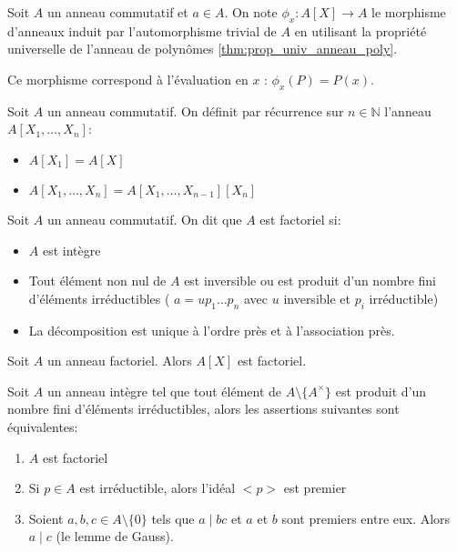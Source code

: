 \begin{definition}[Evaluation]
	Soit $A$ un anneau commutatif et $a \in A$. On note $\phi_x: A[X] \to A$ le morphisme d'anneaux
	induit par l'automorphisme trivial de $A$ en utilisant la propriété universelle de l'anneau de polynômes \ref{thm:prop_univ_anneau_poly}.

	Ce morphisme correspond à l'évaluation en $x$ : $\phi_x(P) = P(x)$.

\end{definition}

\begin{definition}
	Soit $A$ un anneau commutatif. On définit par récurrence sur $n \in \mathbb{N}$ l'anneau $A[X_1, \dots, X_n]$:
	\begin{itemize}
		\item $A[X_1] = A[X]$
		\item $A[X_1, \dots, X_n] = A[X_1, \dots, X_{n-1}][X_n]$
	\end{itemize}
\end{definition}


\begin{definition}
	Soit $A$ un anneau commutatif. On dit que $A$ est factoriel si:
	\begin{itemize}
		\item $A$ est intègre
		\item Tout élément non nul de $A$ est inversible ou est produit d'un nombre fini
		      d'éléments irréductibles ( $a = u p_1 \dots p_n$ avec $u$ inversible et $p_i$ irréductible)
		\item La décomposition est unique à l'ordre près et à l'association près.
	\end{itemize}
\end{definition}

\begin{prop}
	Soit $A$ un anneau factoriel. Alors $A[X]$ est factoriel.
\end{prop}


\begin{prop}
	Soit $A$ un anneau intègre tel que tout élément de $A\setminus\{A^{\times}\}$ est produit d'un nombre fini d'éléments irréductibles, alors les assertions suivantes sont équivalentes:
	\begin{enumerate}
		\item $A$ est factoriel
		\item Si $p \in A$ est irréductible, alors l'idéal $<p>$ est premier
		\item Soient $a,b,c \in A\setminus\{0\}$ tels que $a \mid bc$ et $a$ et $b$ sont premiers entre eux. Alors $a \mid c$ (le lemme de Gauss).
	\end{enumerate}
\end{prop}

